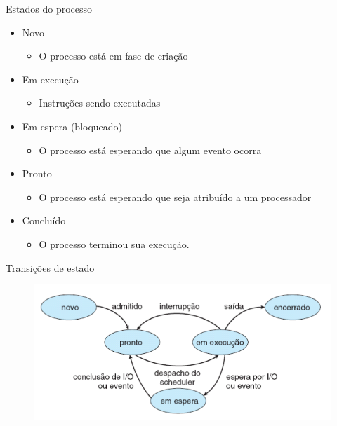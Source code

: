 \documentclass[aspectratio=169,
				xcolor=table]{beamer}
\begin{document}
	\begin{frame}{Estados do processo}
		\begin{itemize}
			\item Novo
			\begin{itemize}
				\item O processo está em fase de criação
			\end{itemize}
			\vspace{0.75em}
			\item Em execução
			\begin{itemize}
				\item Instruções sendo executadas
			\end{itemize}
			\vspace{0.75em}
			\item Em espera (bloqueado)
			\begin{itemize}
				\item O processo está esperando que algum evento ocorra 
			\end{itemize}
			\vspace{0.75em}
			\item Pronto
			\begin{itemize}
				\item O processo está esperando que seja atribuído a um processador
			\end{itemize}
			\vspace{0.75em}
			\item Concluído
			\begin{itemize}
				\item O processo terminou sua execução.
			\end{itemize}
		\end{itemize}
	\end{frame}
	
	\begin{frame}{Transições de estado}
		
	\begin{figure}[hbtp]
	\centering
	\includegraphics[keepaspectratio, width=.9\textwidth]{../figs/cap03/estados.png}	
	\end{figure}
	\end{frame}	
	
\end{document}

